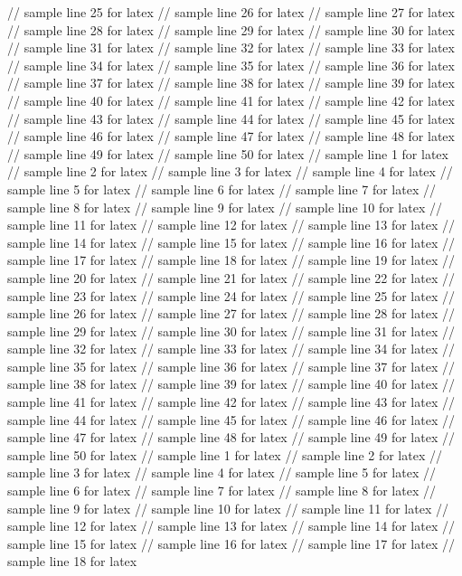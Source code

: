 // sample line 25 for latex
// sample line 26 for latex
// sample line 27 for latex
// sample line 28 for latex
// sample line 29 for latex
// sample line 30 for latex
// sample line 31 for latex
// sample line 32 for latex
// sample line 33 for latex
// sample line 34 for latex
// sample line 35 for latex
// sample line 36 for latex
// sample line 37 for latex
// sample line 38 for latex
// sample line 39 for latex
// sample line 40 for latex
// sample line 41 for latex
// sample line 42 for latex
// sample line 43 for latex
// sample line 44 for latex
// sample line 45 for latex
// sample line 46 for latex
// sample line 47 for latex
// sample line 48 for latex
// sample line 49 for latex
// sample line 50 for latex
// sample line 1 for latex
// sample line 2 for latex
// sample line 3 for latex
// sample line 4 for latex
// sample line 5 for latex
// sample line 6 for latex
// sample line 7 for latex
// sample line 8 for latex
// sample line 9 for latex
// sample line 10 for latex
// sample line 11 for latex
// sample line 12 for latex
// sample line 13 for latex
// sample line 14 for latex
// sample line 15 for latex
// sample line 16 for latex
// sample line 17 for latex
// sample line 18 for latex
// sample line 19 for latex
// sample line 20 for latex
// sample line 21 for latex
// sample line 22 for latex
// sample line 23 for latex
// sample line 24 for latex
// sample line 25 for latex
// sample line 26 for latex
// sample line 27 for latex
// sample line 28 for latex
// sample line 29 for latex
// sample line 30 for latex
// sample line 31 for latex
// sample line 32 for latex
// sample line 33 for latex
// sample line 34 for latex
// sample line 35 for latex
// sample line 36 for latex
// sample line 37 for latex
// sample line 38 for latex
// sample line 39 for latex
// sample line 40 for latex
// sample line 41 for latex
// sample line 42 for latex
// sample line 43 for latex
// sample line 44 for latex
// sample line 45 for latex
// sample line 46 for latex
// sample line 47 for latex
// sample line 48 for latex
// sample line 49 for latex
// sample line 50 for latex
// sample line 1 for latex
// sample line 2 for latex
// sample line 3 for latex
// sample line 4 for latex
// sample line 5 for latex
// sample line 6 for latex
// sample line 7 for latex
// sample line 8 for latex
// sample line 9 for latex
// sample line 10 for latex
// sample line 11 for latex
// sample line 12 for latex
// sample line 13 for latex
// sample line 14 for latex
// sample line 15 for latex
// sample line 16 for latex
// sample line 17 for latex
// sample line 18 for latex
